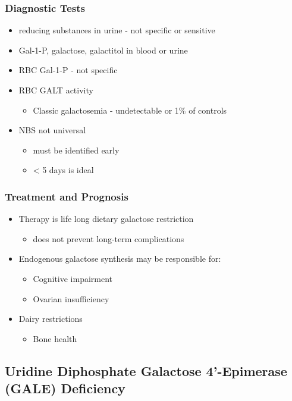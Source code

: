 \documentclass{scrartcl}
\begin{document}
\subsubsection{Diagnostic Tests}
\label{sec:org32a6618}
\begin{itemize}
\item reducing substances in urine - not specific or sensitive
\item Gal-1-P, galactose, galactitol in blood or urine
\item RBC Gal-1-P - not specific
\item RBC GALT activity
\begin{itemize}
\item Classic galactosemia - undetectable or 1\% of controls
\end{itemize}
\item NBS not universal
\begin{itemize}
\item must be identified early
\item \textless{} 5 days is ideal
\end{itemize}
\end{itemize}

\subsubsection{Treatment and Prognosis}
\label{sec:org07cbeab}
\begin{itemize}
\item Therapy is life long dietary galactose restriction
\begin{itemize}
\item does not prevent long-term complications
\end{itemize}

\item Endogenous galactose synthesis may be responsible for:
\begin{itemize}
\item Cognitive impairment
\item Ovarian insufficiency
\end{itemize}
\item Dairy restrictions
\begin{itemize}
\item Bone health
\end{itemize}
\end{itemize}

\subsection{Uridine Diphosphate Galactose 4’-Epimerase (GALE) Deficiency}
\label{sec:orgbb139b4}
\end{document}
